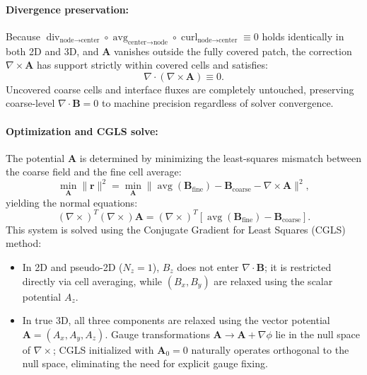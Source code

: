 \documentclass[a4paper, 11pt]{article}
\begin{document}
\paragraph{Divergence preservation:} Because $\operatorname{div}_{\text{node}\to\text{center}} \circ \operatorname{avg}_{\text{center}\to\text{node}} \circ \operatorname{curl}_{\text{node}\to\text{center}} \equiv 0$ holds identically in both 2D and 3D, and $\mathbf{A}$ vanishes outside the fully covered patch, the correction $\nabla \times \mathbf{A}$ has support strictly within covered cells and satisfies:
\begin{equation}
\nabla \cdot (\nabla \times \mathbf{A}) \equiv 0.
\end{equation}
Uncovered coarse cells and interface fluxes are completely untouched, preserving coarse-level $\nabla \cdot \mathbf{B} = 0$ to machine precision regardless of solver convergence.

\paragraph{Optimization and CGLS solve:} The potential $\mathbf{A}$ is determined by minimizing the least-squares mismatch between the coarse field and the fine cell average:
\begin{equation}
\min_{\mathbf{A}} \|\mathbf{r}\|^2 = \min_{\mathbf{A}} \|\operatorname{avg}(\mathbf{B}_{\text{fine}}) - \mathbf{B}_{\text{coarse}} - \nabla \times \mathbf{A}\|^2,
\end{equation}
yielding the normal equations:
\begin{equation}
(\nabla \times)^T (\nabla \times) \mathbf{A} = (\nabla \times)^T [\operatorname{avg}(\mathbf{B}_{\text{fine}}) - \mathbf{B}_{\text{coarse}}].
\end{equation}
This system is solved using the Conjugate Gradient for Least Squares (CGLS) method:
\begin{itemize}
  \item In 2D and pseudo-2D ($N_z = 1$), $B_z$ does not enter $\nabla \cdot \mathbf{B}$; it is restricted directly via cell averaging, while $(B_x, B_y)$ are relaxed using the scalar potential $A_z$.
  \item In true 3D, all three components are relaxed using the vector potential $\mathbf{A} = (A_x, A_y, A_z)$. Gauge transformations $\mathbf{A} \to \mathbf{A} + \nabla \phi$ lie in the null space of $\nabla \times$; CGLS initialized with $\mathbf{A}_0 = 0$ naturally operates orthogonal to the null space, eliminating the need for explicit gauge fixing.
\end{itemize}
\end{document}
